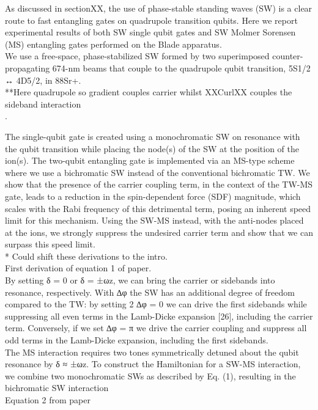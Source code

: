 \documentclass{article}
\begin{document}
    As discussed in sectionXX, the use of phase-stable standing waves (SW) is a clear route to fast entangling gates on quadrupole transition qubits. 
    Here we report experimental results of both SW single qubit gates and SW Molmer Sorensen (MS) entangling gates performed on the Blade apparatus.\\

    We use a free-space, phase-stabilized SW formed by two
    superimposed counter-propagating 674-nm beams that couple to the
    quadrupole qubit transition, 5S1/2 ↔ 4D5/2, in 88Sr+.\\

    **Here quadrupole so gradient couples carrier whilst XXCurlXX couples the sideband interaction\\.

    The single-qubit gate is created using a monochromatic SW on
    resonance with the qubit transition while placing the node(s) of
    the SW at the position of the ion(s). The two-qubit entangling gate
    is implemented via an MS-type scheme where we use a bichromatic SW
    instead of the conventional bichromatic TW. We show that the
    presence of the carrier coupling term, in the context of the TW-MS
    gate, leads to a reduction in the spin-dependent force (SDF)
    magnitude, which scales with the Rabi frequency of this detrimental
    term, posing an inherent speed limit for this mechanism. Using the
    SW-MS instead, with the anti-nodes placed at the ions, we strongly
    suppress the undesired carrier term and show that we can surpass
    this speed limit.\\

    * Could shift these derivations to the intro. \\
    First derivation of equation 1 of paper. \\
    By setting δ = 0 or δ = ±ωz, we can bring the carrier or sidebands
    into resonance, respectively. With ∆φ the SW has an additional
    degree of freedom compared to the TW: by setting 2 ∆φ = 0 we can
    drive the first sidebands while suppressing all even terms in the
    Lamb-Dicke expansion [26], including the carrier term. Conversely,
    if we set ∆φ = π we drive the carrier coupling and suppress all
    odd terms in the Lamb-Dicke expansion, including the first
    sidebands. \\

    The MS interaction requires two tones symmetrically detuned about the
    qubit resonance by δ ≈ ±ωz. To construct the Hamiltonian for a SW-MS
    interaction, we combine two monochromatic SWs as described by Eq. (1),
    resulting in the bichromatic SW interaction\\
    Equation 2 from paper\\
\end{document}
